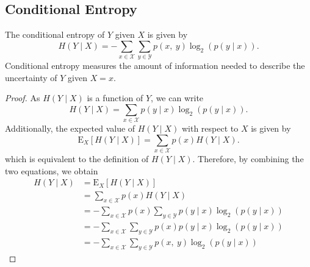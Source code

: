 \documentclass{article}
\begin{document}
\subsection{Conditional Entropy}
The conditional entropy of \(Y\) given \(X\) is given by
\begin{equation*}
    H\left( Y \mid X \right) = -\sum_{x \in \mathcal{X}} \sum_{y \in \mathcal{Y}} p\left( x,\: y \right) \log_2{\left( p\left( y \mid x \right) \right)}.
\end{equation*}
Conditional entropy measures the amount of information needed to
describe the uncertainty of \(Y\) given \(X = x\).
\begin{proof}
    As \(H\left( Y \mid X \right)\) is a function of \(Y\), we can
    write
    \begin{equation*}
        H\left( Y \mid X \right) = \sum_{x \in \mathcal{X}} p\left( y \mid x \right) \log_2{\left( p\left( y \mid x \right) \right)}.
    \end{equation*}
    Additionally, the expected value of \(H\left( Y \mid X \right)\)
    with respect to \(X\) is given by
    \begin{equation*}
        \mathrm{E}_X\left[ H\left( Y \mid X \right) \right] = \sum_{x \in \mathcal{X}} p\left( x \right) H\left( Y \mid X \right).
    \end{equation*}
    which is equivalent to the definition of \(H\left( Y \mid X \right)\).
    Therefore, by combining the two equations, we obtain
    \begin{align*}
        H\left( Y \mid X \right) & = \mathrm{E}_X\left[ H\left( Y \mid X \right) \right]                                                                                           \\
                                 & = \sum_{x \in \mathcal{X}} p\left( x \right) H\left( Y \mid X \right)                                                                           \\
                                 & = -\sum_{x \in \mathcal{X}} p\left( x \right) \sum_{y \in \mathcal{Y}} p\left( y \mid x \right) \log_2{\left( p\left( y \mid x \right) \right)} \\
                                 & = -\sum_{x \in \mathcal{X}} \sum_{y \in \mathcal{Y}} p\left( x \right) p\left( y \mid x \right) \log_2{\left( p\left( y \mid x \right) \right)} \\
                                 & = -\sum_{x \in \mathcal{X}} \sum_{y \in \mathcal{Y}} p\left( x,\: y \right) \log_2{\left( p\left( y \mid x \right) \right)}
    \end{align*}
\end{proof}
\end{document}
